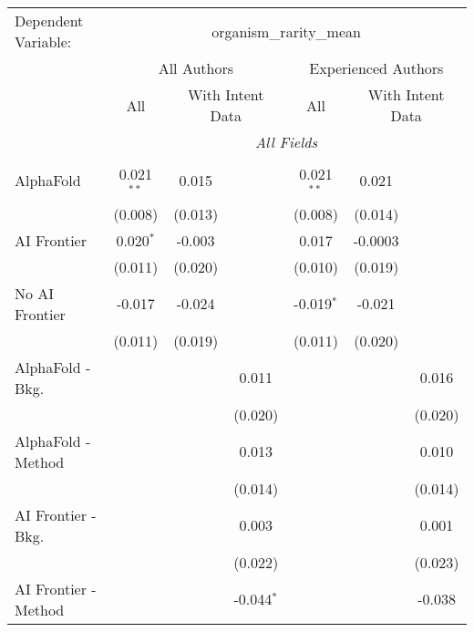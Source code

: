 \begingroup
\centering
\begin{tabular}{lcccccc}
   \tabularnewline \midrule \midrule
   Dependent Variable: & \multicolumn{6}{c}{organism\_rarity\_mean}\\
 & \multicolumn{3}{c}{All Authors} & \multicolumn{3}{c}{Experienced Authors} \\
\cmidrule(lr){2-4} \cmidrule(lr){5-7}
 & \multicolumn{1}{c}{All} & \multicolumn{2}{c}{With Intent Data} & \multicolumn{1}{c}{All} & \multicolumn{2}{c}{With Intent Data} \\
\cmidrule(lr){2-2} \cmidrule(lr){3-4} \cmidrule(lr){5-5} \cmidrule(lr){6-7}
 & \multicolumn{6}{c}{\textit{All Fields}} \\ \\
   AlphaFold               & 0.021$^{**}$ & 0.015   &              & 0.021$^{**}$ & 0.021   &   \\   
                           & (0.008)      & (0.013) &              & (0.008)      & (0.014) &   \\   
   AI Frontier             & 0.020$^{*}$  & -0.003  &              & 0.017        & -0.0003 &   \\   
                           & (0.011)      & (0.020) &              & (0.010)      & (0.019) &   \\   
   No AI Frontier          & -0.017       & -0.024  &              & -0.019$^{*}$ & -0.021  &   \\   
                           & (0.011)      & (0.019) &              & (0.011)      & (0.020) &   \\   
   AlphaFold - Bkg.        &              &         & 0.011        &              &         & 0.016\\   
                           &              &         & (0.020)      &              &         & (0.020)\\   
   AlphaFold - Method      &              &         & 0.013        &              &         & 0.010\\   
                           &              &         & (0.014)      &              &         & (0.014)\\   
   AI Frontier - Bkg.      &              &         & 0.003        &              &         & 0.001\\   
                           &              &         & (0.022)      &              &         & (0.023)\\   
   AI Frontier - Method    &              &         & -0.044$^{*}$ &              &         & -0.038\\   

\end{tabular}
